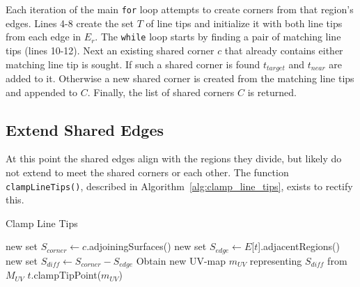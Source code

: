 Each iteration of the main \verb|for| loop attempts to create corners from that region's edges.
Lines 4-8 create the set $T$ of line tips and initialize it with both line tips from each edge in $E_r$.
The \verb|while| loop starts by finding a pair of matching line tips (lines 10-12).
Next an existing shared corner $c$ that already contains either matching line tip is sought.
If such a shared corner is found $t_{target}$ and $t_{near}$ are added to it.
Otherwise a new shared corner is created from the matching line tips and appended to $C$.
Finally, the list of shared corners $C$ is returned.

\subsection{Extend Shared Edges}\label{sec:extend_shared_edges}
At this point the shared edges align with the regions they divide, but likely do not extend to meet the shared corners or each other.
The function \verb|clampLineTips()|, described in Algorithm~\ref{alg:clamp_line_tips}, exists to rectify this.

\begin{algorithm}[htb]
\caption{Clamp Line Tips}\label{alg:clamp_line_tips}
\begin{algorithmic}[1]
		\State new set $S_{corner} \leftarrow c$.adjoiningSurfaces() 
			\State new set $S_{edge} \leftarrow E$[$t$].adjacentRegions()
			\State new set $S_{diff} \leftarrow S_{corner} - S_{edge}$ 
			\State Obtain new UV-map $m_{UV}$ representing $S_{diff}$ from $M_{UV}$
			\State $t$.clampTipPoint($m_{UV}$)\label{alg:clamp_tip_point}
		\EndFor
	\EndFor
\EndFunction
\end{algorithmic}
\end{algorithm}

